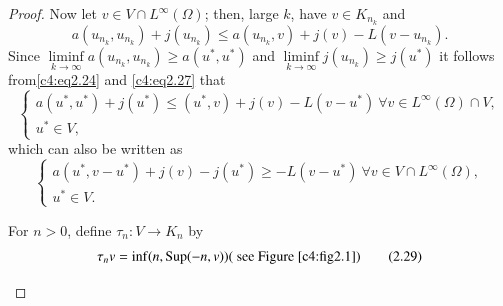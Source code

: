 \begin{proof}
Now let $v \in V \cap L^\infty (\Omega)$; then, large $k$, have $v \in K_{n_k}$ and
 \begin{equation}
a (u_{n_k}, u_{n_k}) + j (u_{n_k}) \leq a (u_{n_k}, v) + j (v) -L (v-u_{n_k}). \tag{2.27}\label{c4:eq2.27}
 \end{equation} 
 Since $\liminf\limits_{k \to \infty} a (u_{n_k}, u_{n_k}) \geq a (u^*, u^*)$ and $\liminf\limits_{k \to \infty} j (u_{n_k}) \geq j (u^*)$ it follows from\pageoriginale   \eqref{c4:eq2.24} and \eqref{c4:eq2.27} that
 \begin{equation*}
\begin{cases}
a (u^*, u^*) + j (u^*) \leq (u^*, v) +j(v) -L (v-u^*) \ \forall v \in L^\infty (\Omega) \cap V, \\
u^* \in V,
\end{cases}
\end{equation*} 
 which can also be written as 
 \begin{equation}
\begin{cases}
a (u^*, v-u^*) + j (v) -j (u^*) \geq -L (v-u^*) \ \forall v \in  V \cap L^\infty (\Omega), \\
u^* \in V. \tag{2.28}\label{c4:eq2.28}
\end{cases}
 \end{equation} 

 For $n > 0$, define $\tau_n : V \to K_n$ by
 \begin{equation}
\tau_n v =\inf (n, \operatorname{Sup} (-n, v)) (\text{ see Figure  \ref{c4:fig2.1}})
\tag{2.29}\label{c4:eq2.29} 
 \end{equation} 

\begin{figure}[H]
  \caption{}\label{c4:fig2.1}
\end{figure}


\end{proof}
